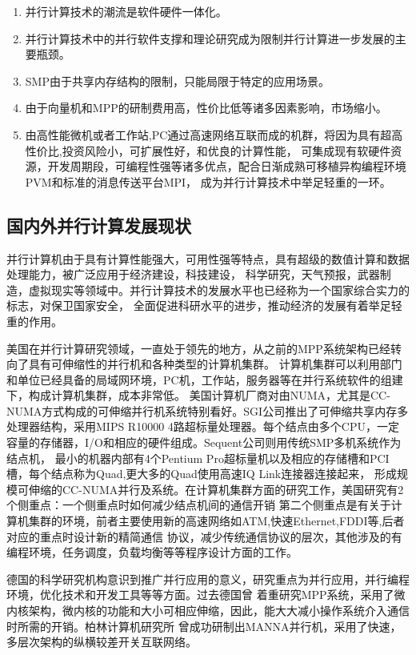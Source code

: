 \begin{enumerate}
\item 并行计算技术的潮流是软件硬件一体化。
\item 并行计算技术中的并行软件支撑和理论研究成为限制并行计算进一步发展的主要瓶颈。
\item SMP由于共享内存结构的限制，只能局限于特定的应用场景。
\item 由于向量机和MPP的研制费用高，性价比低等诸多因素影响，市场缩小。
\item 由高性能微机或者工作站,PC通过高速网络互联而成的机群，将因为具有超高性价比,投资风险小，可扩展性好，和优良的计算性能，
可集成现有软硬件资源，开发周期段，可编程性强等诸多优点，配合日渐成熟可移植异构编程环境PVM和标准的消息传送平台MPI，
成为并行计算技术中举足轻重的一环。
\end{enumerate}

\subsection{国内外并行计算发展现状}
    并行计算机由于具有计算性能强大，可用性强等特点，具有超级的数值计算和数据处理能力，被广泛应用于经济建设，科技建设，
科学研究，天气预报，武器制造，虚拟现实等领域中。并行计算技术的发展水平也已经称为一个国家综合实力的标志，对保卫国家安全，
全面促进科研水平的进步，推动经济的发展有着举足轻重的作用。
    
    美国在并行计算研究领域，一直处于领先的地方，从之前的MPP系统架构已经转向了具有可伸缩性的并行机和各种类型的计算机集群。
计算机集群可以利用部门和单位已经具备的局域网环境，PC机，工作站，服务器等在并行系统软件的组建下，构成计算机集群，成本非常低。
美国计算机厂商对由NUMA，尤其是CC-NUMA方式构成的可伸缩并行机系统特别看好。SGI公司推出了可伸缩共享内存多处理器结构，采用MIPS
R10000 4路超标量处理器。每个结点由多个CPU，一定容量的存储器，I/O和相应的硬件组成。Sequent公司则用传统SMP多机系统作为结点机，
最小的机器内部有4个Pentium Pro超标量机以及相应的存储槽和PCI槽，每个结点称为Quad,更大多的Quad使用高速IQ Link连接器连接起来，
形成规模可伸缩的CC-NUMA并行及系统。在计算机集群方面的研究工作，美国研究有2个侧重点：一个侧重点时如何减少结点机间的通信开销
第二个侧重点是有关于计算机集群的环境，前者主要使用新的高速网络如ATM,快速Ethernet,FDDI等,后者对应的重点时设计新的精简通信
协议，减少传统通信协议的层次，其他涉及的有编程环境，任务调度，负载均衡等等程序设计方面的工作。

    德国的科学研究机构意识到推广并行应用的意义，研究重点为并行应用，并行编程环境，优化技术和开发工具等等方面。过去德国曾
着重研究MPP系统，采用了微内核架构，微内核的功能和大小可相应伸缩，因此，能大大减小操作系统介入通信时所需的开销。柏林计算机研究所
曾成功研制出MANNA并行机，采用了快速，多层次架构的纵横较差开关互联网络。

